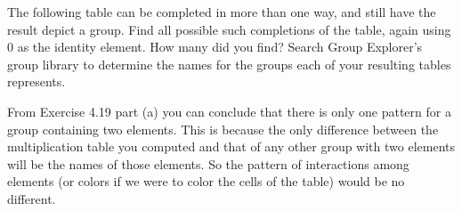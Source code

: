 \documentclass[11pt]{exam}
\begin{document}
\begin{questions}
\begin{solution}
	\end{solution}

	\question The following table can be completed in more than one way, and still have the result depict a group. Find all possible such completions of the table, again using $0$ as the identity element. How many did you find? Search Group Explorer's group library to determine the names for the groups each of your resulting tables represents.
	
	
	\question From Exercise 4.19 part (a) you can conclude that there is only one pattern for a group containing two elements. This is because the only difference between the multiplication table you computed and that of any other group with two elements will be the names of those elements. So the pattern of interactions among elements (or colors if we were to color the cells of the table) would be no different.
	

\end{questions}
\end{document}
